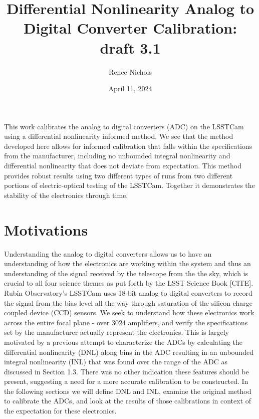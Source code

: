 \documentclass[11pt, letterpaper]{article}
\title{Differential Nonlinearity Analog to Digital Converter Calibration: draft 3.1}
\author{Renee Nichols}
\date{April 11, 2024}
\begin{document}
\maketitle 

This work calibrates the analog to digital converters (ADC) on the LSSTCam using a differential nonlinearity informed method. 
We see that the method developed here allows for informed calibration that falls within the specifications from the manufacturer, including no unbounded integral nonlinearity and differential nonlinearity that does not deviate from expectation. 
This method provides robust results using two different types of runs from two different portions of electric-optical testing of the LSSTCam. 
Together it demonstrates the stability of the electronics through time. 

\section{Motivations}
\indent

 
Understanding the analog to digital converters allows us to have an understanding of how the electronics are working within the system and thus an understanding of the signal received by the telescope from the the sky, which is crucial to all four science themes as put forth by the LSST Science Book [CITE]. 
Rubin Observatory’s LSSTCam uses 18-bit analog to digital converters to record the signal from the bias level all the way through saturation of the silicon charge coupled device (CCD) sensors. 
We seek to understand how these electronics work across the entire focal plane - over 3024 amplifiers, and verify the specifications set by the manufacturer actually represent the electronics. 
This is largely motivated by a previous attempt to characterize the ADCs by calculating the differential nonlinearity (DNL) along bins in the ADC resulting in an unbounded integral nonlinearity (INL) that was found over the range of the ADC as discussed in Section 1.3. 
There was no other indication these features should be present, suggesting a need for a more accurate calibration to be constructed. 
In the following sections we will define DNL and INL, examine the original method to calibrate the ADCs, and look at the results of those calibrations in context of the expectation for these electronics. 
\end{document}
